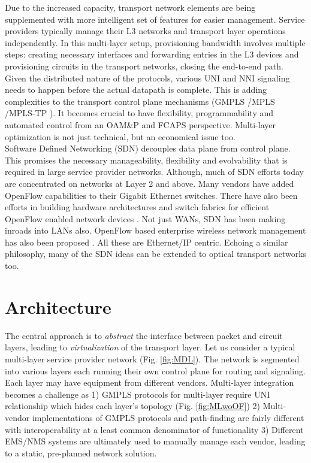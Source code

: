 \documentclass{sig-alternate-2013}
\begin{document}
	Due to the increased capacity, transport network elements are being supplemented with more intelligent
	set of features for easier management. Service providers typically manage their L3 networks and transport
	layer operations independently. In this multi-layer setup, provisioning bandwidth involves multiple
	steps: creating necessary interfaces and forwarding entries in the L3 devices and provisioning circuits
	in the transport networks, closing the end-to-end path. Given the distributed nature of the protocols,
	various UNI and NNI signaling needs to happen before the actual datapath is complete. This is adding
	complexities to the transport control plane mechanisms (GMPLS \cite{gmpls}/MPLS \cite{mpls}/MPLS-TP
	\cite{mpls-tp}). It becomes crucial to have flexibility, programmability and automated control from an
	OAM\&P and FCAPS perspective. Multi-layer optimization is not just technical, but an economical issue
	too. \\
		
	Software Defined Networking (SDN) decouples data plane from control plane. This promises the necessary
	manageability, flexibility and evolvability that is required in large service provider networks.
	Although, much of SDN efforts today are concentrated on networks at Layer 2 and above. Many vendors have
	added OpenFlow capabilities to their Gigabit Ethernet switches. There have also been efforts in building
	hardware architectures \cite{Mogul2012} and switch fabrics for efficient OpenFlow enabled network devices
	\cite{Casado2012}. Not just WANs, SDN has been making inroads into LANs also. OpenFlow based enterprise
	wireless network management has also been proposed \cite{Suresh2012}. All these are Ethernet/IP centric.
	Echoing a similar philosophy, many of the SDN ideas can be extended to optical transport networks too.
\fi
\section{Architecture}
\label{sec:arch}
	The central approach is to \emph{abstract} the interface between packet and circuit layers, leading to \emph{virtualization}
	of the transport layer. Let us consider a typical multi-layer service provider network (Fig. \ref{fig:MDL}). The network is segmented into
	various layers each running their own control plane for routing and signaling. Each layer may have equipment from different vendors. Multi-layer
	integration becomes a challenge as 1) GMPLS protocols for multi-layer require UNI relationship which hides each layer's topology (Fig. \ref{fig:MLwoOF})
	2) Multi-vendor implementations of GMPLS protocols and path-finding are fairly different with interoperability at a least common denominator of functionality 
	3) Different EMS/NMS systems are ultimately used to manually manage each vendor, leading to a static, pre-planned network solution. \\
\end{document}
